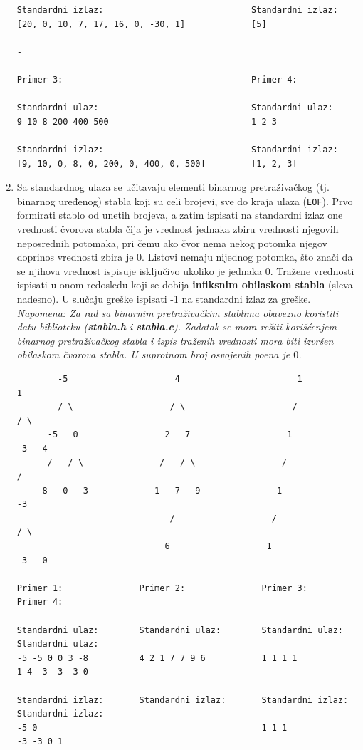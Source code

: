 \begin{enumerate}
\begin{verbatim}
Standardni izlaz:                             Standardni izlaz:        
[20, 0, 10, 7, 17, 16, 0, -30, 1]             [5]                      
--------------------------------------------------------------------

Primer 3:                                     Primer 4:

Standardni ulaz:                              Standardni ulaz:
9 10 8 200 400 500                            1 2 3

Standardni izlaz:                             Standardni izlaz:
[9, 10, 0, 8, 0, 200, 0, 400, 0, 500]         [1, 2, 3]
\end{verbatim}  

\item Sa standardnog ulaza se učitavaju elementi binarnog pretraživačkog (tj. binarnog uređenog) stabla koji su celi brojevi, sve do kraja ulaza 
(\texttt{EOF}). Prvo formirati stablo od unetih brojeva, a zatim ispisati na standardni izlaz one vrednosti čvorova stabla čija je vrednost jednaka zbiru vrednosti njegovih neposrednih potomaka, pri čemu ako čvor nema nekog potomka njegov doprinos vrednosti zbira je 0. Listovi nemaju nijednog potomka, što znači da se njihova vrednost ispisuje isključivo ukoliko je jednaka 0. Tražene vrednosti ispisati u onom redosledu koji se dobija \textbf{infiksnim obilaskom stabla} (sleva nadesno). U slučaju greške ispisati -1 na standardni izlaz za greške. \textit{Napomena: Za rad sa binarnim pretraživačkim stablima obavezno koristiti datu biblioteku (\textbf{stabla.h} i \textbf{stabla.c}). Zadatak se mora rešiti korišćenjem binarnog pretraživačkog stabla i ispis traženih vrednosti mora biti izvršen obilaskom čvorova stabla. U suprotnom broj osvojenih poena je $0$.}

\begin{verbatim}
        -5                     4                       1                       1    
        / \                   / \                     /                       / \
      -5   0                 2   7                   1                      -3   4
      /   / \               /   / \                 /                       /   
    -8   0   3             1   7   9               1                      -3   
                              /                   /                       / \
                             6                   1                      -3   0

Primer 1:               Primer 2:               Primer 3:               Primer 4:                

Standardni ulaz:        Standardni ulaz:        Standardni ulaz:        Standardni ulaz: 
-5 -5 0 0 3 -8          4 2 1 7 7 9 6           1 1 1 1                 1 4 -3 -3 -3 0

Standardni izlaz:       Standardni izlaz:       Standardni izlaz:       Standardni izlaz:        
-5 0                                            1 1 1                   -3 -3 0 1 
\end{verbatim}  

\end{enumerate}

